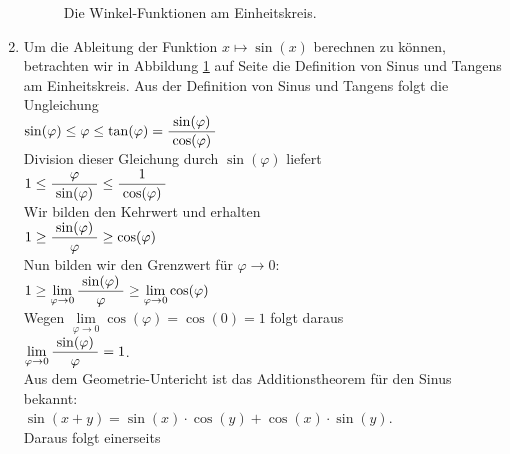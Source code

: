 \begin{enumerate}
 

      \begin{figure}[!h]
        \centering
        \caption{Die Winkel-Funktionen am Einheitskreis.}
        \label{fig:circle}
      \end{figure}
\item Um die Ableitung der Funktion $x \mapsto \sin(x)$ berechnen zu k\"onnen, 
      betrachten wir in Abbildung \ref{fig:circle} auf Seite \pageref{fig:circle} die Definition von
      Sinus und Tangens am Einheitskreis.  Aus der Definition von Sinus und Tangens folgt die Ungleichung 
      \\[0.3cm]
      \hspace*{1.3cm}
      $\sin(\varphi) \leq \varphi \leq \tan(\varphi) = \displaystyle\frac{\;\displaystyle\sin(\varphi)\;}{\;\displaystyle\cos(\varphi)\;}$
      \\[0.3cm]
      Division dieser Gleichung durch $\sin(\varphi)$ liefert
      \\[0.3cm]
      \hspace*{1.3cm}
      $1 \leq \displaystyle\frac{\;\displaystyle\varphi\;}{\;\displaystyle\sin(\varphi)\;} \leq \displaystyle\frac{\;\displaystyle1\;}{\;\displaystyle\cos(\varphi)\;}$
      \\[0.3cm]
      Wir bilden den Kehrwert und erhalten
      \\[0.3cm]
      \hspace*{1.3cm}
      $1 \geq \displaystyle\frac{\;\displaystyle\sin(\varphi)\;}{\;\displaystyle\varphi\;} \geq \cos(\varphi)$
      \\[0.3cm]
      Nun bilden wir den Grenzwert f\"ur $\varphi \rightarrow 0$:
      \\[0.3cm]
      \hspace*{1.3cm}
      $1 \geq \lim\limits_{\varphi \rightarrow 0} \displaystyle\frac{\;\displaystyle\sin(\varphi)\;}{\;\displaystyle\varphi\;} \geq \lim\limits_{\varphi \rightarrow 0}\cos(\varphi)$
      \\[0.3cm]
      Wegen $\lim\limits_{\varphi \rightarrow 0} \cos(\varphi) = \cos(0) = 1$ folgt daraus
      \\[0.1cm]
      \hspace*{1.3cm}
      $\lim\limits_{\varphi \rightarrow 0} \displaystyle\frac{\;\displaystyle\sin(\varphi)\;}{\;\displaystyle\varphi\;} = 1$.
      \\[0.3cm]
       Aus dem Geometrie-Untericht ist das Additionstheorem f\"ur den Sinus 
       bekannt: 
       \\[0.3cm]
       \hspace*{1.3cm} $\sin(x+y) = \sin(x) \cdot \cos(y) + \cos(x) \cdot \sin(y)$.
         \\[0.2cm]
       Daraus folgt einerseits
       \\[0.3cm]

\end{enumerate}
